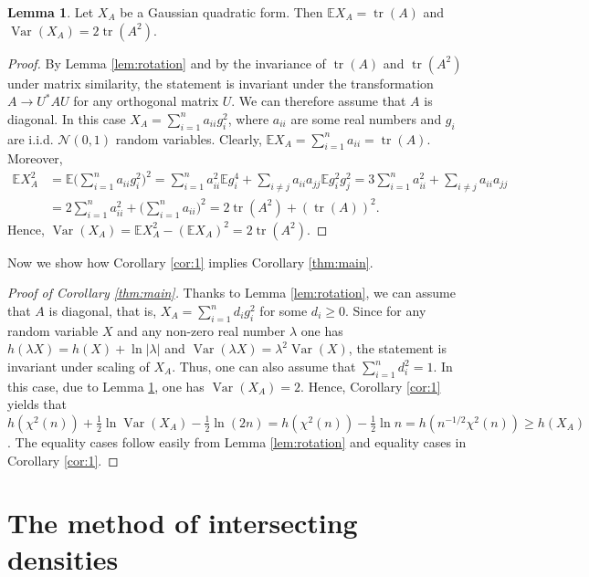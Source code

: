 \documentclass[11pt]{amsart}
\newcommand{\mc}[1]{\mathcal{{#1}}}
\newcommand{\1}{\mathbf{1}}
\DeclareMathOperator{\tr}{tr}
\newcommand{\E}{\mathbb{E}}
\DeclareMathOperator{\var}{Var}
\theoremstyle{definition}
\newtheorem{lemma}{Lemma}
\theoremstyle{definition}
\theoremstyle{remark}
\begin{document}
\begin{lemma}\label{lem:variance}
Let $X_A$ be a Gaussian quadratic form. Then $\E X_A = \tr(A)$ and $\var(X_A)=2\tr(A^2)$.
\end{lemma}

\begin{proof}
By Lemma \ref{lem:rotation} and by the invariance of $\tr(A)$ and $\tr(A^2)$ under matrix similarity, the statement is invariant under the transformation $A \to U^\ast A U$ for any orthogonal matrix $U$. We can therefore assume that $A$ is diagonal. In this case $X_A = \sum_{i=1}^n a_{ii} g_i^2$, where $a_{ii}$ are some real numbers and $g_i$ are i.i.d. $\mc{N}(0,1)$ random variables. Clearly, $\E X_A = \sum_{i=1}^n a_{ii} = \tr(A)$. Moreover,
\begin{align*}
	\E X_A^2 & = \E \Big( \sum_{i=1}^n a_{ii} g_i^2 \Big)^2 = \sum_{i=1}^n a_{ii}^2 \E g_i^4 + \sum_{i \ne j} a_{ii} a_{jj} \E g_i^2 g_j^2  = 3 \sum_{i=1}^n a_{ii}^2 + \sum_{i \ne j} a_{ii} a_{jj} \\ & = 2 \sum_{i=1}^n a_{ii}^2 + \Big(  \sum_{i=1}^n a_{ii}\Big)^2 = 2 \tr(A^2) + (\tr(A))^2.
\end{align*}
Hence, $\var(X_A) = \E X_A^2 - (\E X_A)^2 = 2\tr(A^2)$.

\end{proof}



Now we show how Corollary \ref{cor:1} implies Corollary \ref{thm:main}.

\begin{proof}[Proof of Corollary \ref{thm:main}]
Thanks to Lemma \ref{lem:rotation}, we can assume that $A$ is diagonal, that is, $X_A = \sum_{i=1}^n d_i g_i^2$ for some $d_i \geq 0$.  Since for any random variable $X$ and any non-zero real number $\lambda$ one has $h(\lambda X)=h(X)+\ln|\lambda|$ and $\var(\lambda X) = \lambda^2 \var(X)$, the statement is invariant under scaling of $X_A$. Thus, one can also assume that $\sum_{i=1}^n d_i^2 = 1$. In this case, due to Lemma \ref{lem:variance}, one has $\var(X_A)= 2$. Hence, Corollary \ref{cor:1} yields that $h\left( \chi^2(n) \right) + \frac12 \ln  \var(X_A) - \frac12 \ln (2n) = h(\chi^2(n))-\frac12 \ln n = h(n^{-1/2} \chi^2(n)) \geq h(X_A)$.  The equality cases follow easily from Lemma \ref{lem:rotation} and equality cases in Corollary \ref{cor:1}.   
\end{proof}

\section{The method of intersecting densities}\label{sec:intersecting}
\end{document}
